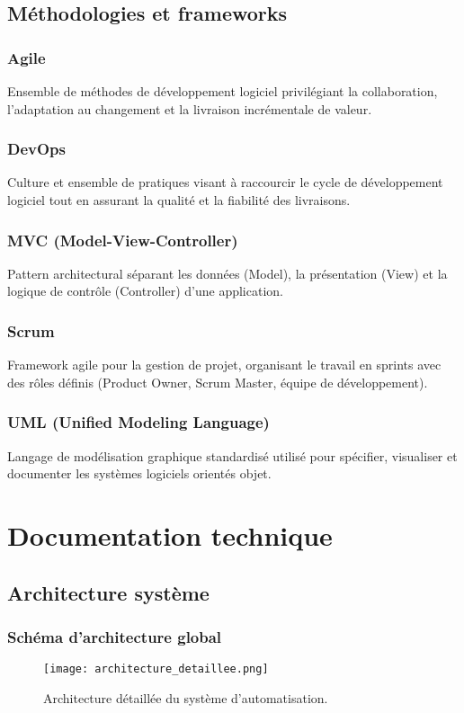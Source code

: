 \section{Méthodologies et frameworks}

\subsection{Agile}
Ensemble de méthodes de développement logiciel privilégiant la collaboration, l'adaptation au changement et la livraison incrémentale de valeur.

\subsection{DevOps}
Culture et ensemble de pratiques visant à raccourcir le cycle de développement logiciel tout en assurant la qualité et la fiabilité des livraisons.

\subsection{MVC (Model-View-Controller)}
Pattern architectural séparant les données (Model), la présentation (View) et la logique de contrôle (Controller) d'une application.

\subsection{Scrum}
Framework agile pour la gestion de projet, organisant le travail en sprints avec des rôles définis (Product Owner, Scrum Master, équipe de développement).

\subsection{UML (Unified Modeling Language)}
Langage de modélisation graphique standardisé utilisé pour spécifier, visualiser et documenter les systèmes logiciels orientés objet.

\chapter{Documentation technique}
\label{app:documentation}

\section{Architecture système}

\subsection{Schéma d'architecture global}
\begin{figure}[hbt!]
    \centering
    \texttt{[image: architecture\_detaillee.png]}
    \caption{Architecture détaillée du système d'automatisation.}
    \label{fig:architecture-detaillee}
\end{figure}

